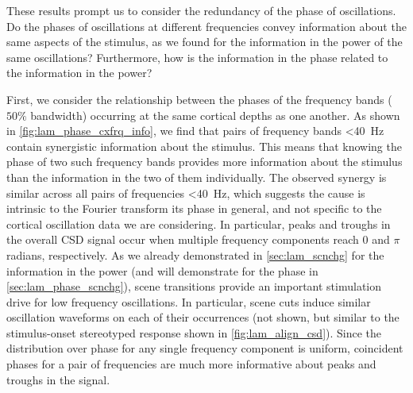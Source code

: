 These results prompt us to consider the redundancy of the phase of oscillations.
Do the phases of oscillations at different frequencies convey information about the same aspects of the stimulus, as we found for the information in the power of the same oscillations?
Furthermore, how is the information in the phase related to the information in the power?

First, we consider the relationship between the phases of the frequency bands ($50\%$ bandwidth) occurring at the same cortical depths as one another.
As shown in \autoref{fig:lam_phase_cxfrq_info}, we find that pairs of frequency bands \SI{<40}{Hz} contain synergistic information about the stimulus.
This means that knowing the phase of two such frequency bands provides more information about the stimulus than the information in the two of them individually.
The observed synergy is similar across all pairs of frequencies \SI{<40}{Hz}, which suggests the cause is intrinsic to the Fourier transform its phase in general, and not specific to the cortical oscillation data we are considering.
In particular, peaks and troughs in the overall \ac{CSD} signal occur when multiple frequency components reach $0$ and $\pi$ radians, respectively.
As we already demonstrated in \autoref{sec:lam_scnchg} for the information in the power (and will demonstrate for the phase in \autoref{sec:lam_phase_scnchg}), scene transitions provide an important stimulation drive for low frequency oscillations.
In particular, scene cuts induce similar oscillation waveforms on each of their occurrences (not shown, but similar to the stimulus-onset stereotyped response shown in \autoref{fig:lam_align_csd}).
Since the distribution over phase for any single frequency component is uniform, coincident phases for a pair of frequencies are much more informative about peaks and troughs in the signal.
%
%
%


